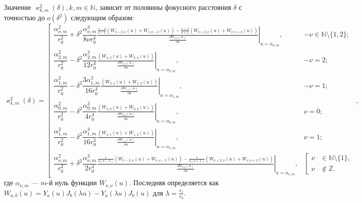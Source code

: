 \begin{theorem}
	Значение $\varkappa^2_{k,m}(\delta), k, m \in \mathbb{N}$, зависит от половины фокусного расстояния $\delta$ с точностью до $o(\delta^2)$ следующим образом:
{\small
\begin{equation}
\varkappa^2_{k,m}(\delta) = \left[
\begin{array}{cc}
\dfrac{\alpha_{\nu, m}^2}{r_0^2} + \delta^2 \dfrac{\alpha_{\nu, m}^3}{8 \nu r_0^4} \left. \frac{
\frac{\nu-2}{\nu-1}
\left(
W_{\nu-2, \nu}(u) + W_{\nu, \nu-2}(u)
\right)- 
\frac{\nu+2}{\nu+1}
\left(
W_{\nu+2, \nu}(u) + W_{\nu, \nu+2}(u)
\right)
}{ \frac{\partial W_{\nu,\nu}(u)}{\partial u} }\right|_{u=\alpha_{\nu, m}},  & -\nu \in \mathbb{N} \setminus \{1, 2\}; \\

\dfrac{\alpha_{2, m}^2}{r_0^2} - \delta^2 \dfrac{\alpha_{2, m}^3}{12  r_0^4} \left. \frac{
	\left(
	W_{4, 2}(u) + W_{2, 4}(u)
	\right)
}{ \frac{\partial W_{2,2}(u)}{\partial u} }\right|_{u=\alpha_{2, m}}, & -\nu=2; \\

\dfrac{\alpha_{1, m}^2}{r_0^2} - \delta^2 \dfrac{3 \alpha_{1, m}^3 }{16 r_0^4}
\left. \frac{
	\left(
	W_{3, 1}(u) + W_{1, 3}(u)
	\right)
}{ \frac{\partial W_{1,1}(u)}{\partial u} }\right|_{u=\alpha_{1, m}}, & -\nu=1; \\


\dfrac{\alpha_{0, m}^2}{r_0^2} - \delta^2 \dfrac{\alpha_{0, m}^3}{4r_0^4} \left. \frac{
 \left( W_{2, 0}(u) + W_{0, 2}(u) \right)
}{ \frac{\partial W_{0,0}(u)}{\partial u} }\right|_{u=\alpha_{0, m}}, & \nu=0;   \\

\dfrac{\alpha_{1, m}^2}{r_0^2} - \delta^2 \dfrac{\alpha_{1, m}^3}{16 r_0^4} \left. \frac{ \left( W_{3, 1}(u) + W_{1, 3}(u) \right)
}{ \frac{\partial W_{1,1}(u)}{\partial u} }\right|_{u=\alpha_{1, m}},    & \nu=1;\\

\dfrac{\alpha_{\nu, m}^2}{r_0^2} + \delta^2 \dfrac{\alpha_{\nu, m}^3}{2 r_0^4} \left. \frac{
\frac{1}{4(\nu-1)} \left( W_{\nu-2, \nu}(u) + W_{\nu, \nu-2}(u) \right) - \frac{1}{4(\nu+1)} \left( W_{\nu+2, \nu}(u) + W_{\nu, \nu+2}(u) \right)
}{ \frac{\partial W_{\nu,\nu}(u)}{\partial u} }\right|_{u=\alpha_{\nu, m}},
&   \left[
\begin{aligned}
\nu &\in \mathbb{N} \setminus \{1\},\\
\nu &\notin \mathbb{Z}.
\end{aligned}
\right.
\end{array}
\right.,
\label{eq:valRing}
\end{equation}
}
где $\alpha_{\nu, m}$ --- $m$-й нуль функции $W_{\nu, \nu}(u)$. Последняя определяется как $W_{a, b}(u) = Y_a(u)J_b(\lambda u) - Y_a(\lambda u)J_b(u)$ для $\lambda = \frac{r_1}{r_0}$.
\label{th:sect2_th4}
\end{theorem}

